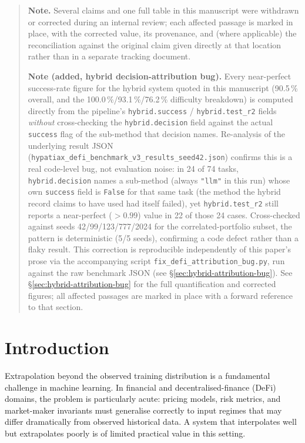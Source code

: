 \documentclass[twoside,11pt]{article}
\begin{document}
\begin{quote}\small
\textbf{Note.} Several claims and one full table in this manuscript were
withdrawn or corrected during an internal review; each affected passage is
marked in place, with the corrected value, its provenance, and (where
applicable) the reconciliation against the original claim given directly
at that location rather than in a separate tracking document.

\medskip
\noindent\textbf{Note (added, hybrid decision-attribution bug).} Every
near-perfect success-rate figure for the hybrid system quoted in this
manuscript (90.5\,\% overall, and the 100.0\,\%/93.1\,\%/76.2\,\% difficulty
breakdown) is computed directly from the pipeline's \texttt{hybrid.success}
/ \texttt{hybrid.test\_r2} fields \emph{without} cross-checking the
\texttt{hybrid.decision} field against the actual \texttt{success} flag of
the sub-method that decision names. Re-analysis of the underlying result
JSON (\texttt{hypatiax\_defi\_benchmark\_v3\_results\_seed42.json}) confirms
this is a real code-level bug, not evaluation noise: in 24 of 74 tasks,
\texttt{hybrid.decision} names a sub-method (always \texttt{"llm"} in this
run) whose own \texttt{success} field is \texttt{False} for that same task
(the method the hybrid record claims to have used had itself failed), yet
\texttt{hybrid.test\_r2} still reports a near-perfect ($>0.99$) value in 22
of those 24 cases. Cross-checked against seeds
42/99/123/777/2024 for the correlated-portfolio subset, the pattern is
deterministic (5/5 seeds), confirming a code defect rather than a flaky
result. This correction is reproducible independently of this paper's prose
via the accompanying script \texttt{fix\_defi\_attribution\_bug.py}, run
against the raw benchmark JSON (see \S\ref{sec:hybrid-attribution-bug}).
See \S\ref{sec:hybrid-attribution-bug} for the full quantification
and corrected figures; all affected passages are marked in place with a
forward reference to that section.
\end{quote}


\tableofcontents
\newpage

\section{Introduction}
\label{sec:intro}

Extrapolation beyond the observed training distribution is a fundamental challenge
in machine learning.  In financial and decentralised-finance (DeFi) domains, the
problem is particularly acute: pricing models, risk metrics, and market-maker
invariants must generalise correctly to input regimes that may differ dramatically
from observed historical data.  A system that interpolates well but extrapolates
poorly is of limited practical value in this setting.
\end{document}
